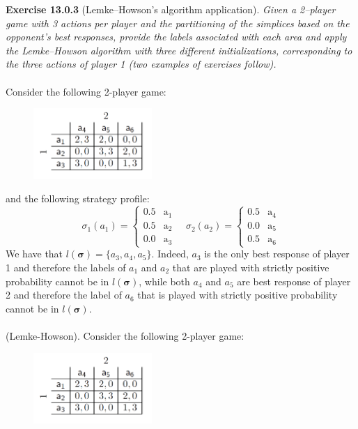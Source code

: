 \textbf{Exercise 13.0.3} (Lemke–Howson’s algorithm application). \textit{Given a 2–player game with 3 actions per player and the partitioning of the simplices based on the opponent’s best responses, provide the labels associated with each area and apply the Lemke–Howson algorithm with three different initializations, corresponding to the three actions of player 1 (two examples of exercises follow).}\\\\
Consider the following 2-player game:
\begin{figure}[H]
\centering
\includegraphics[width=0.4\textwidth]{images/img_2_13_01.png}
\end{figure}
\noindent
and the following strategy profile:
$$
\sigma_{1}\left(a_{1}\right)=\left\{\begin{array}{ll}
0.5 & \mathrm{a}_{1} \\
0.5 & \mathrm{a}_{2} \\
0.0 & \mathrm{a}_{3}
\end{array} \quad \sigma_{2}\left(a_{2}\right)=\left\{\begin{array}{ll}
0.5 & \mathrm{a}_{4} \\
0.0 & \mathrm{a}_{5} \\
0.5 & \mathrm{a}_{6}
\end{array}\right.\right.
$$
We have that $l( \mathbf{\sigma} ) = \{a_3, a_4, a_5\}$. Indeed, $a_3$ is the only best response of player 1 and therefore the labels of $a_1$ and $a_2$ that are played with strictly positive probability cannot be in $l( \mathbf{\sigma} )$, while both $a_4$ and $a_5$ are best response of player 2 and therefore the label of $a_6$ that is played with strictly positive probability cannot be in $l(\mathbf{\sigma})$.\\\\
(Lemke-Howson). Consider the following 2-player game:
\begin{figure}[H]
\centering
\includegraphics[width=0.4\textwidth]{images/img_2_13_01.png}
\end{figure}
